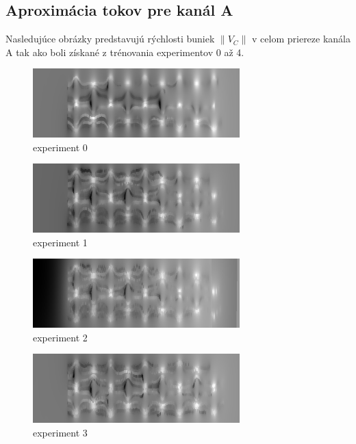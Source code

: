 \documentclass[10pt,a4paper]{article}
\begin{document}
\subsection{Aproximácia tokov pre kanál A}

Nasledujúce obrázky predstavujú rýchlosti buniek $\left\lVert V_{C} \right\rVert$ v celom priereze kanála A tak ako boli
získané z trénovania experimentov 0 až 4.

\begin{figure}[!ht]
\centering
\includegraphics[width=8cm]{images/e0_approximation_size.png}
\caption{experiment 0}
\label{img:experiment0}
\end{figure}

\begin{figure}[!ht]
\centering
\includegraphics[width=8cm]{images/e1_approximation_size.png}
\caption{experiment 1}
\label{img:experiment1}
\end{figure}

\begin{figure}[!ht]
\centering
\includegraphics[width=8cm]{images/e2_approximation_size.png}
\caption{experiment 2}
\label{img:experiment2}
\end{figure}

\begin{figure}[!ht]
\centering
\includegraphics[width=8cm]{images/e3_approximation_size.png}
\caption{experiment 3}
\label{img:experiment3}
\end{figure}
\end{document}
